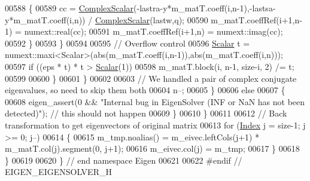 \begin{DoxyCode}
00588             \{
00589               cc = \hyperlink{group___eigenvalues___module_a4d0b2a773357d0a6ec98e026f04002ed}{ComplexScalar}(-lastra-y*m\_matT.coeff(i,n-1),-lastsa-y*m\_matT.coeff(i,n)) / 
      \hyperlink{group___eigenvalues___module_a4d0b2a773357d0a6ec98e026f04002ed}{ComplexScalar}(lastw,q);
00590               m\_matT.coeffRef(i+1,n-1) = numext::real(cc);
00591               m\_matT.coeffRef(i+1,n) = numext::imag(cc);
00592             \}
00593           \}
00594 
00595           \textcolor{comment}{// Overflow control}
00596           \hyperlink{group___eigenvalues___module_a017d49fe0d59874b70a2fcf35e5aa373}{Scalar} t = numext::maxi<Scalar>(abs(m\_matT.coeff(i,n-1)),abs(m\_matT.coeff(i,n)));
00597           \textcolor{keywordflow}{if} ((eps * t) * t > \hyperlink{group___eigenvalues___module_a017d49fe0d59874b70a2fcf35e5aa373}{Scalar}(1))
00598             m\_matT.block(i, n-1, size-i, 2) /= t;
00599 
00600         \}
00601       \}
00602       
00603       \textcolor{comment}{// We handled a pair of complex conjugate eigenvalues, so need to skip them both}
00604       n--;
00605     \}
00606     \textcolor{keywordflow}{else}
00607     \{
00608       eigen\_assert(0 && \textcolor{stringliteral}{"Internal bug in EigenSolver (INF or NaN has not been detected)"}); \textcolor{comment}{// this should
       not happen}
00609     \}
00610   \}
00611 
00612   \textcolor{comment}{// Back transformation to get eigenvectors of original matrix}
00613   \textcolor{keywordflow}{for} (\hyperlink{group___eigenvalues___module_a5bff6a6bc0efac67d52c60c2c3deb9ee}{Index} j = size-1; j >= 0; j--)
00614   \{
00615     m\_tmp.noalias() = m\_eivec.leftCols(j+1) * m\_matT.col(j).segment(0, j+1);
00616     m\_eivec.col(j) = m\_tmp;
00617   \}
00618 \}
00619 
00620 \} \textcolor{comment}{// end namespace Eigen}
00621 
00622 \textcolor{preprocessor}{#endif // EIGEN\_EIGENSOLVER\_H}
\end{DoxyCode}
